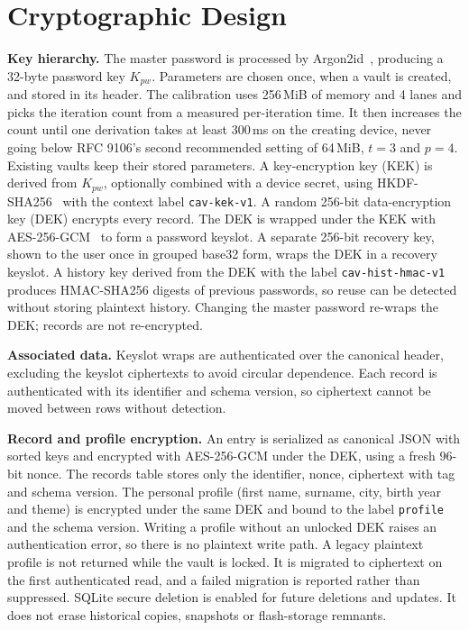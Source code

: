 \documentclass[conference]{IEEEtran}
\begin{document}
\section{Cryptographic Design}
\textbf{Key hierarchy.} The master password is processed by Argon2id~\cite{rfc9106}, producing a 32-byte password key $K_{pw}$. Parameters are chosen once, when a vault is created, and stored in its header. The calibration uses 256\,MiB of memory and 4 lanes and picks the iteration count from a measured per-iteration time. It then increases the count until one derivation takes at least 300\,ms on the creating device, never going below RFC 9106's second recommended setting of 64\,MiB, $t=3$ and $p=4$. Existing vaults keep their stored parameters. A key-encryption key (KEK) is derived from $K_{pw}$, optionally combined with a device secret, using HKDF-SHA256~\cite{rfc5869} with the context label \texttt{cav-kek-v1}. A random 256-bit data-encryption key (DEK) encrypts every record. The DEK is wrapped under the KEK with AES-256-GCM~\cite{gcm} to form a password keyslot. A separate 256-bit recovery key, shown to the user once in grouped base32 form, wraps the DEK in a recovery keyslot. A history key derived from the DEK with the label \texttt{cav-hist-hmac-v1} produces HMAC-SHA256 digests of previous passwords, so reuse can be detected without storing plaintext history. Changing the master password re-wraps the DEK; records are not re-encrypted.

\textbf{Associated data.} Keyslot wraps are authenticated over the canonical header, excluding the keyslot ciphertexts to avoid circular dependence. Each record is authenticated with its identifier and schema version, so ciphertext cannot be moved between rows without detection.

\textbf{Record and profile encryption.} An entry is serialized as canonical JSON with sorted keys and encrypted with AES-256-GCM under the DEK, using a fresh 96-bit nonce. The records table stores only the identifier, nonce, ciphertext with tag and schema version. The personal profile (first name, surname, city, birth year and theme) is encrypted under the same DEK and bound to the label \texttt{profile} and the schema version. Writing a profile without an unlocked DEK raises an authentication error, so there is no plaintext write path. A legacy plaintext profile is not returned while the vault is locked. It is migrated to ciphertext on the first authenticated read, and a failed migration is reported rather than suppressed. SQLite secure deletion is enabled for future deletions and updates. It does not erase historical copies, snapshots or flash-storage remnants.
\end{document}
